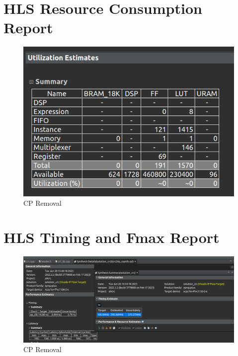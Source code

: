 \documentclass{article}
\begin{document}
\section{HLS Resource Consumption Report}
\vspace{1cm}
\begin{figure}[h]
\centering
\includegraphics[width=\textwidth]{figs/1.png}
    \caption{CP Removal}
    \label{fig:my_label}
\end{figure}

\vspace{13cm}


\section{HLS Timing and Fmax Report}
\vspace{1cm}
\begin{figure}[h]
    \centering
\includegraphics[width=\textwidth]{figs/2.png}
    \caption{CP Removal}
    \label{fig:my_label}
\end{figure}

\vspace{15cm}
\end{document}
